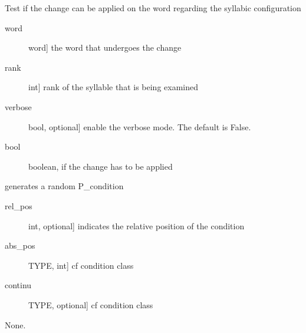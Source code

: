 \documentclass[letterpaper,10pt,english]{sphinxmanual}
\begin{document}
\begin{fulllineitems}
\begin{fulllineitems}
\label{\detokenize{index:Condition.S_condition.test}}
\sphinxAtStartPar
Test if the change can be applied on the word regarding the syllabic configuration
\begin{description}
\item[{word}] \leavevmode{[}word{]}
\sphinxAtStartPar
the word that undergoes the change

\item[{rank}] \leavevmode{[}int{]}
\sphinxAtStartPar
rank of the syllable that is being examined

\item[{verbose}] \leavevmode{[}bool, optional{]}
\sphinxAtStartPar
enable the verbose mode. The default is False.

\end{description}
\begin{description}
\item[{bool}] \leavevmode
\sphinxAtStartPar
boolean, if the change has to be applied

\end{description}

\end{fulllineitems}


\end{fulllineitems}


\begin{fulllineitems}
\label{\detokenize{index:Condition.rd_p_condition}}
\sphinxAtStartPar
generates a random P\_condition
\begin{description}
\item[{rel\_pos}] \leavevmode{[}int, optional{]}
\sphinxAtStartPar
indicates the relative position of the condition

\item[{abs\_pos}] \leavevmode{[}TYPE, int{]}
\sphinxAtStartPar
cf condition class

\item[{continu}] \leavevmode{[}TYPE, optional{]}
\sphinxAtStartPar
cf condition class

\end{description}

\sphinxAtStartPar
None.

\end{fulllineitems}
\end{document}
